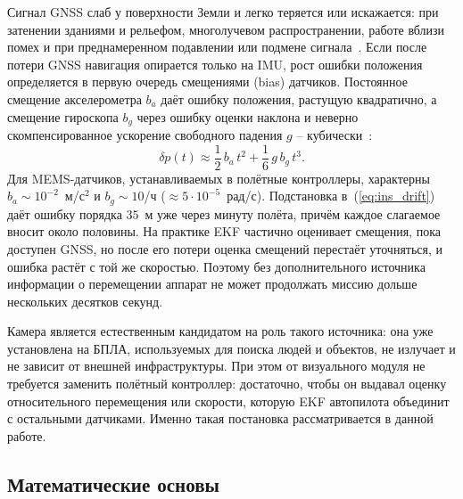     Сигнал GNSS слаб у поверхности Земли и легко теряется или искажается: при затенении зданиями и рельефом, многолучевом распространении, работе вблизи помех и при преднамеренном подавлении или подмене сигнала~\cite{groves}.
    Если после потери GNSS навигация опирается только на IMU, рост ошибки положения определяется в первую очередь смещениями (bias) датчиков.
    Постоянное смещение акселерометра $b_a$ даёт ошибку положения, растущую квадратично, а смещение гироскопа $b_g$ через ошибку оценки наклона и неверно скомпенсированное ускорение свободного падения $g$ -- кубически~\cite{groves}:
    \begin{equation}\label{eq:ins_drift}
        \delta p(t) \approx \frac{1}{2}\, b_a\, t^2 + \frac{1}{6}\, g\, b_g\, t^3 .
    \end{equation}
    Для MEMS-датчиков, устанавливаемых в полётные контроллеры, характерны $b_a \sim 10^{-2}$~м/с$^2$ и $b_g \sim 10$\textdegree/ч ($\approx 5\cdot 10^{-5}$~рад/с).
    Подстановка в~(\ref{eq:ins_drift}) даёт ошибку порядка $35$~м уже через минуту полёта, причём каждое слагаемое вносит около половины.
    На практике EKF частично оценивает смещения, пока доступен GNSS, но после его потери оценка смещений перестаёт уточняться, и ошибка растёт с той же скоростью.
    Поэтому без дополнительного источника информации о перемещении аппарат не может продолжать миссию дольше нескольких десятков секунд.

    Камера является естественным кандидатом на роль такого источника: она уже установлена на БПЛА, используемых для поиска людей и объектов, не излучает и не зависит от внешней инфраструктуры.
    При этом от визуального модуля не требуется заменить полётный контроллер: достаточно, чтобы он выдавал оценку относительного перемещения или скорости, которую EKF автопилота объединит с остальными датчиками.
    Именно такая постановка рассматривается в данной работе.

    \subsection{Математические основы}

